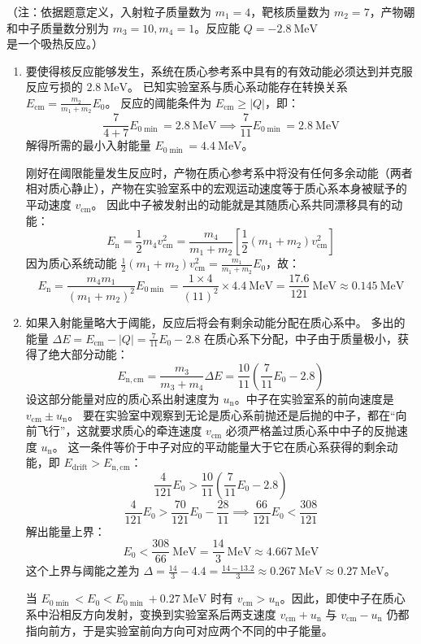 \begin{solution}
（注：依据题意定义，入射粒子质量数为 $m_1 = 4$，靶核质量数为 $m_2 = 7$，产物硼和中子质量数分别为 $m_3 = 10, m_4 = 1$。反应能 $Q = -2.8 \ \mathrm{MeV}$ 是一个吸热反应。）

\begin{enumerate}
    \item[(a)] 要使得核反应能够发生，系统在质心参考系中具有的有效动能必须达到并克服反应亏损的 $2.8 \ \mathrm{MeV}$。
    已知实验室系与质心系动能存在转换关系 $E_{\text{cm}} = \frac{m_2}{m_1 + m_2} E_0$。
    反应的阈能条件为 $E_{\text{cm}} \ge |Q|$，即：
    $$ \frac{7}{4 + 7} E_{0\min} = 2.8 \ \mathrm{MeV} \implies \frac{7}{11} E_{0\min} = 2.8 \ \mathrm{MeV} $$
    解得所需的最小入射能量 $E_{0\min} = 4.4 \ \mathrm{MeV}$。
    
    刚好在阈限能量发生反应时，产物在质心参考系中将没有任何多余动能（两者相对质心静止），产物在实验室系中的宏观运动速度等于质心系本身被赋予的平动速度 $v_{\text{cm}}$。
    因此中子被发射出的动能就是其随质心系共同漂移具有的动能：
    $$ E_{\mathrm{n}} = \frac{1}{2} m_4 v_{\text{cm}}^2 = \frac{m_4}{m_1+m_2} \left[ \frac{1}{2} (m_1+m_2) v_{\text{cm}}^2 \right] $$
    因为质心系统动能 $\frac{1}{2} (m_1+m_2) v_{\text{cm}}^2 = \frac{m_1}{m_1+m_2} E_0$，故：
    $$ E_{\mathrm{n}} = \frac{m_4 m_1}{(m_1 + m_2)^2} E_{0\min} = \frac{1 \times 4}{(11)^2} \times 4.4 \ \mathrm{MeV} = \frac{17.6}{121} \ \mathrm{MeV} \approx 0.145 \ \mathrm{MeV} $$

    \item[(b)] 如果入射能量略大于阈能，反应后将会有剩余动能分配在质心系中。
    多出的能量 $\Delta E = E_{\text{cm}} - |Q| = \frac{7}{11} E_0 - 2.8$ 在质心系下分配，中子由于质量极小，获得了绝大部分动能：
    $$ E_{\mathrm{n,cm}} = \frac{m_3}{m_3 + m_4} \Delta E = \frac{10}{11} \left( \frac{7}{11} E_0 - 2.8 \right) $$
    设这部分能量对应的质心系出射速度为 $u_{\mathrm{n}}$。中子在实验室系的前向速度是 $v_{\text{cm}} \pm u_{\mathrm{n}}$。
    要在实验室中观察到无论是质心系前抛还是后抛的中子，都在“向前飞行”，这就要求质心的牵连速度 $v_{\text{cm}}$ 必须严格盖过质心系中中子的反抛速度 $u_{\mathrm{n}}$。
    这一条件等价于中子对应的平动能量大于它在质心系获得的剩余动能，即 $E_{\mathrm{drift}} > E_{\mathrm{n,cm}}$：
    $$ \frac{4}{121} E_0 > \frac{10}{11} \left( \frac{7}{11} E_0 - 2.8 \right) $$
    $$ \frac{4}{121} E_0 > \frac{70}{121} E_0 - \frac{28}{11} \implies \frac{66}{121} E_0 < \frac{308}{121} $$
    解出能量上界：
    $$ E_0 < \frac{308}{66} \ \mathrm{MeV} = \frac{14}{3} \ \mathrm{MeV} \approx 4.667 \ \mathrm{MeV} $$
    这个上界与阈能之差为 $\Delta = \frac{14}{3} - 4.4 = \frac{14 - 13.2}{3} \approx 0.267 \ \mathrm{MeV} \approx 0.27 \ \mathrm{MeV}$。
    
    当 $E_{0\min} < E_0 < E_{0\min} + 0.27 \ \mathrm{MeV}$ 时有 $v_{\text{cm}} > u_{\mathrm{n}}$。因此，即使中子在质心系中沿相反方向发射，变换到实验室系后两支速度 $v_{\text{cm}}+u_{\mathrm{n}}$ 与 $v_{\text{cm}}-u_{\mathrm{n}}$ 仍都指向前方，于是实验室前向方向可对应两个不同的中子能量。
\end{enumerate}
\end{solution}

